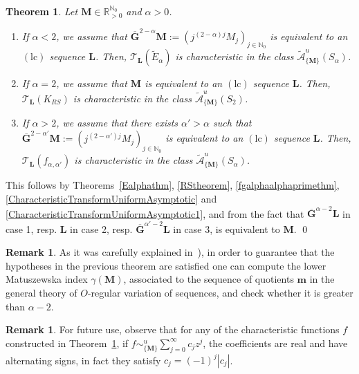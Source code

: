 \documentclass[11pt,a4paper]{article}
\theoremstyle{plain}
\newtheorem{theorem}[proposition]{Theorem}
\theoremstyle{definition}
\newtheorem{remark}[proposition]{Remark}
\newcommand{\RR}{\mathbb{R}}
\newcommand{\NN}{\mathbb{N}}
\newcommand{\M}{\mathbf{M}}
\newcommand{\m}{\boldsymbol{m}}
\newcommand{\LL}{\mathbf{L}}
\newcommand{\G}{\mathbf{G}}
\def\a{\alpha}
\begin{document}
\begin{theorem}\label{mainTthm1}
	Let $\M\in\RR_{>0}^{\NN_0}$ and $\alpha>0$.
	\begin{enumerate}
		\item If $\alpha< 2$, we assume that  $\overline{\G}^{2-\alpha}\M:=(j^{(2-\alpha)j}M_j)_{j\in\NN_0}$
		is equivalent to an \hyperlink{lc}{$(\text{lc})$} sequence $\LL$. Then, $\mathcal{T}_{\LL} (\widetilde{E}_{\alpha}) $ is  characteristic in the class $\widetilde{\mathcal{A}}^u_{\{\M\}} (S_{\alpha})$.
		\item If $\alpha= 2$, we assume that  $\M$
		is equivalent to an \hyperlink{lc}{$(\text{lc})$} sequence $\LL$. Then, $\mathcal{T}_{\LL} (K_{RS}) $ is characteristic in the class $\widetilde{\mathcal{A}}^u_{\{\M\}} (S_{2})$.
		\item If $\alpha>2$, we assume that there exists $\a'>\a$ such that $\overline{\G}^{2-\alpha'}\M:=(j^{(2-\alpha')j}M_j)_{j\in\NN_0}$
		is equivalent to an \hyperlink{lc}{$(\text{lc})$} sequence $\LL$. Then, $\mathcal{T}_{\LL} (f_{\alpha,\alpha'}) $ is characteristic in the class $\widetilde{\mathcal{A}}^u_{\{\M\}} (S_{\alpha})$.
	\end{enumerate}
\end{theorem}
%
%
%
This follows by Theorems~\ref{Ealphathm}, \ref{RStheorem}, \ref{fgalphaalphaprimethm},  \ref{CharacteristicTransformUniformAsymptotic} and \ref{CharacteristicTransformUniformAsymptotic1}, and  from the fact that $\overline{\G}^{\alpha-2}\LL$ in case 1, resp. $\LL$ in case 2, resp. $\overline{\G}^{\alpha'-2}\LL$ in case 3, is equivalent to $\M$.
\qed\enddemo
\begin{remark}%
	As it was carefully explained in~\cite[Remark 4.10]{ultraholomstab}), in order to guarantee that the hypotheses in the previous theorem are satisfied one can compute the lower Matuszewska index  $\gamma(\M)$, associated to the sequence of quotients $\m$ in the general theory of $O$-regular variation of sequences, and check whether it is greater than $\a-2$.
\end{remark}



\begin{remark}\label{rem.signofcoefficients} For future use, observe that for any of the characteristic functions $f$ constructed in Theorem~\ref{mainTthm1}, if  $f\sim^u_{\{\M\}} \sum_{j=0}^\infty c_j z^j$, the coefficients are real and have alternating signs, in fact they satisfy $c_j=(-1)^j|c_j|$.
\end{remark}
\end{document}
